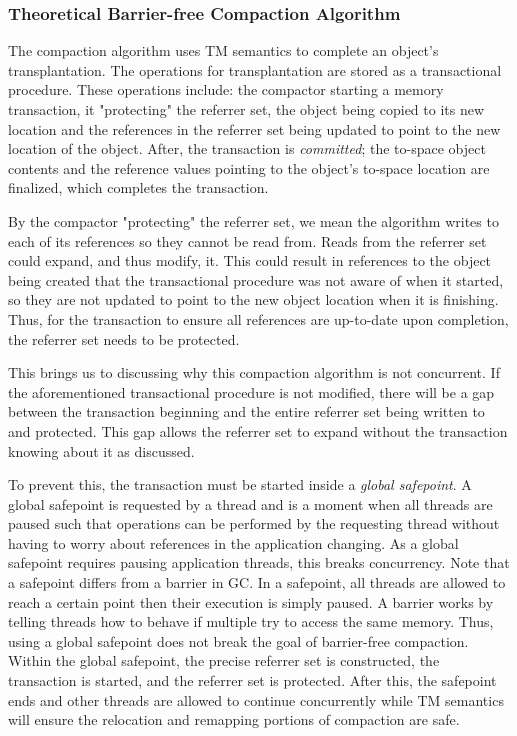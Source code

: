 \documentclass{sig-alternate}
\begin{document}
\subsubsection{Theoretical Barrier-free Compaction Algorithm}
\label{sec:collieAlgorithmNoBarriers}

The compaction algorithm uses TM semantics to complete an object's
transplantation. The operations for transplantation are stored as a
transactional procedure. These operations include: the compactor 
starting a memory transaction, it "protecting" the referrer set, 
the object being copied to its new location and the references in the 
referrer set being updated to point to the new location of the object.
After, the transaction is \emph{committed}; the to-space object contents
and the reference values pointing to the object's to-space location
are finalized, which completes the transaction.

By the compactor "protecting" the referrer set, we mean the algorithm
writes to each of its references so they cannot be read from. 
Reads from the referrer set could expand, and thus modify, it. This could result
in references to the object being created that the transactional procedure
was not aware of when it started, so they are not updated to point to 
the new object location when it is finishing. Thus, for the transaction to
ensure all references are up-to-date upon completion, the referrer set needs
to be protected.

This brings us to discussing why this compaction algorithm is not concurrent. 
If the aforementioned transactional procedure is not
modified, there will be a gap between the transaction beginning and
the entire referrer set being written to and protected. This gap allows 
the referrer set to expand without the transaction knowing about it
as discussed.

To prevent this, the transaction must be started inside a \emph{global safepoint}.
A global safepoint is requested by a thread and is a moment when all 
threads are paused such that operations can be performed by the requesting thread without having to worry 
about references in the application changing. As a global safepoint requires pausing application
threads, this breaks concurrency.
Note that a safepoint differs from a barrier in GC. In a safepoint,
all threads are allowed to reach a certain point then their execution is simply paused.
A barrier works by telling threads how to behave if multiple try to access the same
memory. Thus, using a global safepoint does not break the goal of barrier-free compaction.
Within the global safepoint, the precise referrer
set is constructed, the transaction is started, and the referrer set is protected.
After this, the safepoint ends and other threads are allowed to continue concurrently
while TM semantics will ensure the relocation and remapping portions of compaction
are safe.
\end{document}
